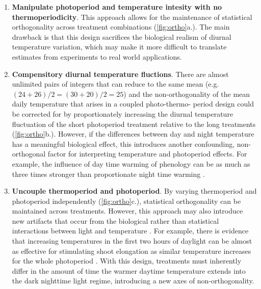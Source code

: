 \documentclass[11pt]{article}
\begin{document}
\begin{enumerate}
\item \textbf{Manipulate photoperiod and temperature intesity with no thermoperiodicity}. This approach allows for the maintenance of statistical orthogonality across treatment combinations (\ref{fig:ortho}a.). The main drawback is that this design sacrifices the biological realism of diurnal temperature variation, which may make it more difficult to translate estimates from experiments to real world applications.

\item \textbf{Compensitory diurnal temperature fluctions}. There are almost unlimited pairs of integers that can reduce to the same mean (e.g. $(24+26)/2 = (30+20)/2 = 25$) and the non-orthogonality of the mean daily temperature that arises in a coupled photo-thermo- period design could be corrected for by proportionately increasing the diurnal temperature fluctuation of the short photoperiod treatment relative to the long treatments (\ref{fig:ortho}b.). However, if the differences between day and night temperature has a meaningful biological effect, this introduces another confounding, non-orthogonal factor for interpreting temperature and photoperiod effects. For example, the influence of day time warming of phenology can be as much as three times stronger than proportionate night time warming \citep{Rossi2017,Meng:2020ui}.

\item \textbf{Uncouple thermoperiod and photoperiod}. By varying thermoperiod and photoperiod independently (\ref{fig:ortho}c.), statistical orthogonality can be maintained across treatments. However, this approach may also introduce new artifacts that occur from the biological rather than statistical interactions between light and temperature \citep{Chew:2012wj}. For example, there is evidence that increasing temperatures in the first two hours of daylight can be almost as effective for stimulating shoot elongation as similar temperature increases for the whole photoperiod \citep{Erwin1998}. With this design, treatments must inherently differ in the amount of time the warmer daytime temperature extends into the dark nighttime light regime, introducing a new axes of non-orthogonality.
\end{enumerate}
\end{document}
